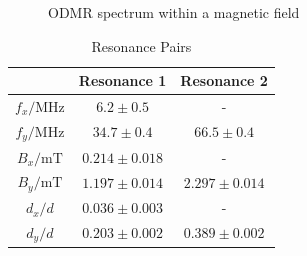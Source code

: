 \begin{figure}
\begin{subfigure}{0.5\textwidth}
		\label{fig:odmr-magnet-z}
	\end{subfigure}
	\caption{ODMR spectrum within a magnetic field}
	\label{fig:odmr-magnet}
\end{figure}

\begin{table}
	\centering
	\begin{tabular}{c|c|c}
		&Resonance 1&Resonance 2\\\hline
		$f_x / \mathrm{MHz}$&$6.2\pm0.5$&-\\
		$f_y / \mathrm{MHz}$&$34.7\pm0.4$&$66.5\pm0.4$\\\hline
		$B_x / \mathrm{mT}$&$0.214\pm0.018$&-\\
		$B_y / \mathrm{mT}$&$1.197\pm0.014$&$2.297\pm0.014$\\\hline
		$d_x/d$&$0.036\pm0.003$&-\\
		$d_y/d$&$0.203\pm0.002$&$0.389\pm0.002$
	\end{tabular}
	\caption{Resonance Pairs}
\end{table}